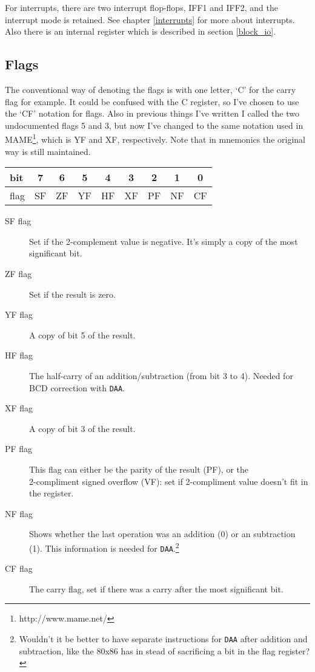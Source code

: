 \documentclass[twoside,openright,a4paper]{book}
\newcommand{\instrt}{\rule{0pt}{2.7ex}}
\newcommand{\instrb}{\rule[-1.7ex]{0pt}{0pt}}
\begin{document}
For interrupts, there are two interrupt flop-flops, IFF1 and IFF2, and the interrupt mode is retained. See chapter \ref{interrupts} for more about interrupts. Also there is an internal register which is described in section \ref{block_io}.


\subsection{Flags}
\label{flags}

The conventional way of denoting the flags is with one letter, `C' for the carry flag for example. It could be confused with the C register, so I've chosen to use the `CF' notation for flags. Also in previous things I've written I called the two undocumented flags 5 and 3, but now I've changed to the same notation used in MAME\footnote{http://www.mame.net/}, which is YF and XF, respectively. Note that in mnemonics the original way is still maintained.

\begin{tabular}{|l|c|c|c|c|c|c|c|c|} 
	\hline
	bit & 7 & 6 & 5 & 4 & 3 & 2 & 1 & 0 \instrt\instrb \\
	\hline
	flag & SF & ZF & YF & HF & XF & PF & NF & CF \instrt\instrb \\ 
	\hline
\end{tabular}

\begin{description}

	\item[SF flag]
	Set if the 2-complement value is negative. It's simply a copy of the most significant bit.

	\item[ZF flag]
	Set if the result is zero.

	\item[YF flag]
	A copy of bit 5 of the result.

	\item[HF flag]
	The half-carry of an addition/subtraction (from bit 3 to 4). Needed for BCD correction with {\tt DAA}.

	\item[XF flag]
	A copy of bit 3 of the result.

	\item[PF flag]
	This flag can either be the parity of the result (PF), or the \\ 2-compliment signed overflow (VF): set if 2-compliment value doesn't fit in the register.

	\item[NF flag]
	Shows whether the last operation was an addition (0) or an subtraction (1). This information is needed for {\tt DAA}.\footnote{Wouldn't it be better to have separate instructions for {\tt DAA} after addition and subtraction, like the 80x86 has in stead of sacrificing a bit in the flag register?}

	\item[CF flag]
	The carry flag, set if there was a carry after the most significant bit.

\end{description}
\end{document}
